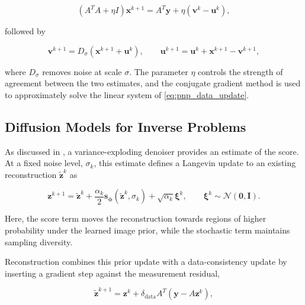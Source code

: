 \begin{equation}
(A^TA+\eta I)\mathbf{x}^{k+1}
=
A^T\mathbf{y}+\eta(\mathbf{v}^k-\mathbf{u}^k),
\label{eq:pnp_data_update}
\end{equation}

followed by

\begin{equation}
\mathbf{v}^{k+1}=D_\sigma(\mathbf{x}^{k+1}+\mathbf{u}^k),
\qquad
\mathbf{u}^{k+1}=\mathbf{u}^k+\mathbf{x}^{k+1}-\mathbf{v}^{k+1},
\label{eq:pnp_denoising_update}
\end{equation}

where $D_\sigma$ removes noise at scale $\sigma$. The parameter $\eta$ controls the strength of agreement between the two estimates, and the conjugate gradient method is used to approximately solve the linear system of \autoref{eq:pnp_data_update}.

\subsection{Diffusion Models for Inverse Problems}
\label{subsec:diffusion_models_inverse_problems}

As discussed in , a variance-exploding denoiser provides an estimate of the score. At a fixed noise level, $\sigma_k$, this estimate defines a Langevin update \cite{song_generative_2019} to an existing reconstruction $\tilde{\mathbf{z}}^k$ as

\begin{equation}
\mathbf{z}^{k+1}
=
\tilde{\mathbf{z}}^k
+
\frac{\alpha_k}{2}
\mathbf{s}_{\boldsymbol{\phi}}(\tilde{\mathbf{z}}^k,\sigma_k)
+
\sqrt{\alpha_k}\boldsymbol{\xi}^k,
\qquad
\boldsymbol{\xi}^k\sim\mathcal{N}(\mathbf{0},\mathbf{I}).
\label{eq:Langevin_step}
\end{equation}

Here, the score term moves the reconstruction towards regions of higher probability under the learned image prior, while the stochastic term maintains sampling diversity.

Reconstruction combines this prior update with a data-consistency update by inserting a gradient step against the measurement residual,

\begin{equation}
\tilde{\mathbf{z}}^{k+1}
=
\mathbf{z}^k
+
\delta_{\mathrm{data}}
A^T(\mathbf{y}-A\mathbf{z}^k),
\label{eq:langevin_data_update}
\end{equation}

